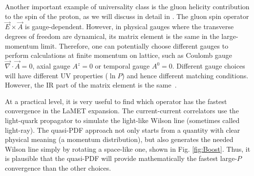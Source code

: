 Another important example of universality class is the gluon helicity
contribution to the spin of the proton, as we will
discuss in detail in . The gluon
spin operator $\vec{E}\times \vec{A}$ is gauge-dependent. However, in physical gauges where the transverse degrees of
freedom are dynamical, its matrix element is the same in
the large-momentum limit. Therefore,
one can potentially choose different gauges to perform
calculations at finite momentum on lattice, such as Coulomb gauge $\vec{\nabla}\cdot \vec{A}=0$,
axial gauge $A^z=0$ or temporal gauge $A^0=0$.  Different gauge choices
will have different UV properties ($\ln P$) and hence different
matching conditions. However, the IR part of the matrix element
is the same~\cite{Hatta:2013gta}.

At a practical level, it is very useful to find which
operator has the fastest convergence in the LaMET expansion.
The current-current correlators use the light-quark propagator to simulate
the light-like Wilson line (sometimes called light-ray). The quasi-PDF approach not only starts from
a quantity with clear physical meaning (a momentum distribution),
but also generates the needed Wilson line simply by rotating a
space-like one, shown in Fig. \ref{fig:Boost}. Thus, it is plausible
that the quasi-PDF will provide mathematically the fastest large-$P$
convergence than the other choices.

